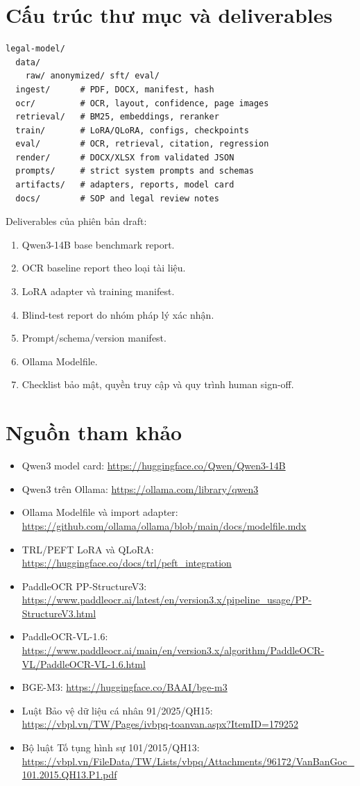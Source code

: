 \documentclass[11pt,a4paper]{article}
\begin{document}
\section{Cấu trúc thư mục và deliverables}

\begin{lstlisting}[basicstyle=\ttfamily\scriptsize,frame=single,rulecolor=\color{bluegray}]
legal-model/
  data/
    raw/ anonymized/ sft/ eval/
  ingest/      # PDF, DOCX, manifest, hash
  ocr/         # OCR, layout, confidence, page images
  retrieval/   # BM25, embeddings, reranker
  train/       # LoRA/QLoRA, configs, checkpoints
  eval/        # OCR, retrieval, citation, regression
  render/      # DOCX/XLSX from validated JSON
  prompts/     # strict system prompts and schemas
  artifacts/   # adapters, reports, model card
  docs/        # SOP and legal review notes
\end{lstlisting}

Deliverables của phiên bản draft:

\begin{enumerate}
  \item Qwen3-14B base benchmark report.
  \item OCR baseline report theo loại tài liệu.
  \item LoRA adapter và training manifest.
  \item Blind-test report do nhóm pháp lý xác nhận.
  \item Prompt/schema/version manifest.
  \item Ollama Modelfile.
  \item Checklist bảo mật, quyền truy cập và quy trình human sign-off.
\end{enumerate}

\section{Nguồn tham khảo}

\begin{itemize}
  \item Qwen3 model card: \url{https://huggingface.co/Qwen/Qwen3-14B}
  \item Qwen3 trên Ollama: \url{https://ollama.com/library/qwen3}
  \item Ollama Modelfile và import adapter: \url{https://github.com/ollama/ollama/blob/main/docs/modelfile.mdx}
  \item TRL/PEFT LoRA và QLoRA: \url{https://huggingface.co/docs/trl/peft_integration}
  \item PaddleOCR PP-StructureV3: \url{https://www.paddleocr.ai/latest/en/version3.x/pipeline_usage/PP-StructureV3.html}
  \item PaddleOCR-VL-1.6: \url{https://www.paddleocr.ai/main/en/version3.x/algorithm/PaddleOCR-VL/PaddleOCR-VL-1.6.html}
  \item BGE-M3: \url{https://huggingface.co/BAAI/bge-m3}
  \item Luật Bảo vệ dữ liệu cá nhân 91/2025/QH15: \url{https://vbpl.vn/TW/Pages/ivbpq-toanvan.aspx?ItemID=179252}
  \item Bộ luật Tố tụng hình sự 101/2015/QH13: \url{https://vbpl.vn/FileData/TW/Lists/vbpq/Attachments/96172/VanBanGoc_101.2015.QH13.P1.pdf}
\end{itemize}
\end{document}
